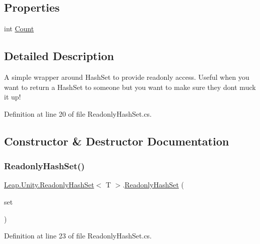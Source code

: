 \subsection*{Properties}
\begin{DoxyCompactItemize}
\item 
int \mbox{\hyperlink{struct_leap_1_1_unity_1_1_readonly_hash_set_a3b33c3913042d04cc2bef0c7fd8ee919}{Count}}
\end{DoxyCompactItemize}


\subsection{Detailed Description}
A simple wrapper around Hash\+Set to provide readonly access. Useful when you want to return a Hash\+Set to someone but you want to make sure they don\textquotesingle{}t muck it up! 



Definition at line 20 of file Readonly\+Hash\+Set.\+cs.



\subsection{Constructor \& Destructor Documentation}
\mbox{\label{struct_leap_1_1_unity_1_1_readonly_hash_set_a6333253382bb5c531d714107afdfc39b}} 
\subsubsection{\texorpdfstring{ReadonlyHashSet()}{ReadonlyHashSet()}}
{\footnotesize\ttfamily \mbox{\hyperlink{struct_leap_1_1_unity_1_1_readonly_hash_set}{Leap.\+Unity.\+Readonly\+Hash\+Set}}$<$ T $>$.\mbox{\hyperlink{struct_leap_1_1_unity_1_1_readonly_hash_set}{Readonly\+Hash\+Set}} (\begin{DoxyParamCaption}\item[{Hash\+Set$<$ T $>$}]{set }\end{DoxyParamCaption})}



Definition at line 23 of file Readonly\+Hash\+Set.\+cs.



